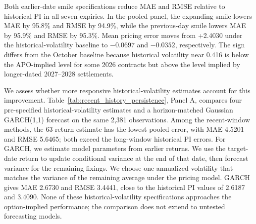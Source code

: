 Both earlier-date smile specifications reduce MAE and RMSE relative to historical PI in all seven expiries. In the pooled panel, the expanding smile lowers MAE by 95.8\% and RMSE by 94.9\%, while the previous-day smile lowers MAE by 95.9\% and RMSE by 95.3\%. Mean pricing error moves from +2.4030 under the historical-volatility baseline to $-0.0697$ and $-0.0352$, respectively. The sign differs from the October baseline because historical volatility near 0.416 is below the APO-implied level for some 2026 contracts but above the level implied by longer-dated 2027--2028 settlements.

We assess whether more responsive historical-volatility estimates account for this improvement. Table~\ref{tab:recent_history_persistence}, Panel A, compares four pre-specified historical-volatility estimates and a horizon-matched Gaussian GARCH(1,1) forecast on the same 2,381 observations. Among the recent-window methods, the 63-return estimate has the lowest pooled error, with MAE 4.5201 and RMSE 5.6465; both exceed the long-window historical PI errors. For GARCH, we estimate model parameters from earlier returns. We use the target-date return to update conditional variance at the end of that date, then forecast variance for the remaining fixings. We choose one annualized volatility that matches the variance of the remaining average under the pricing model. GARCH gives MAE 2.6730 and RMSE 3.4441, close to the historical PI values of 2.6187 and 3.4090. None of these historical-volatility specifications approaches the option-implied performance; the comparison does not extend to untested forecasting models.

